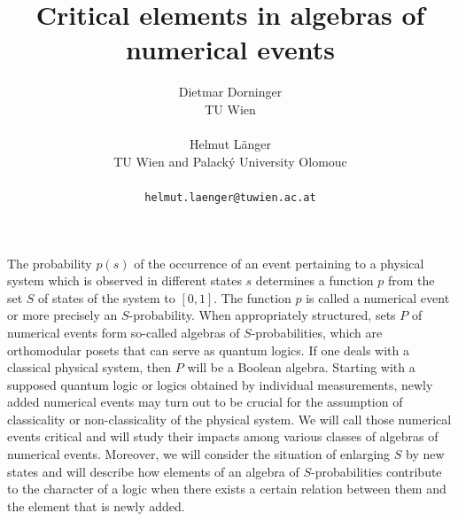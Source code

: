 \documentclass[a4paper]{article} %
\date{} %
\begin{document}
	\setcounter{page}{1} %
	
	\title{Critical elements in algebras of numerical events}
	
	\author{Dietmar Dorninger \\ %
		TU Wien\\ \\ %
		Helmut L\"anger \\ %
		TU Wien and Palack\'y University Olomouc\\ \\ %
		\texttt{helmut.laenger@tuwien.ac.at} %
	}%
	
	\maketitle
	
	
The probability $p(s)$ of the occurrence of an event pertaining to a physical system which is observed in different states $s$ determines a function $p$ from the set $S$ of states of the system to $[0,1]$. The function $p$ is called a numerical event or more precisely an $S$-probability. When appropriately structured, sets $P$ of numerical events form so-called algebras of $S$-probabilities, which are orthomodular posets that can serve as quantum logics. If one deals with a classical physical system, then $P$ will be a Boolean algebra. Starting with a supposed quantum logic or logics obtained by individual measurements, newly added numerical events may turn out to be crucial for the assumption of classicality or non-classicality of the physical system. We will call those numerical events critical and will study their impacts among various classes of algebras of numerical events. Moreover, we will consider the situation of enlarging $S$ by new states and will describe how elements of an algebra of $S$-probabilities contribute to the character of a logic when there exists a certain relation between them and the element that is newly added.
\end{document}
